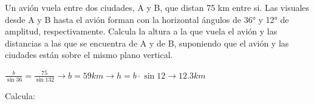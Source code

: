 \documentclass[addpoints,spanish, 12pt,a4paper]{exam}
\begin{document}
\begin{questions}
        
        \question[2] Un avión vuela entre dos ciudades, A y B, que distan 75 km entre si. Las visuales desde A y B hasta el avión forman con la horizontal ángulos de 36° y 12° de amplitud, respectivamente. Calcula la altura a la que vuela el avión y las distancias a las que se encuentra de A y de B, suponiendo que el avión y las ciudades están sobre el mismo plano vertical.
        \begin{solution}
        $\frac{b}{\sin 36}=\frac{75}{\sin 132}\to b = 59km \to h=b\cdot\sin 12 \to12.3km$
        \end{solution}
        
        
        \question Calcula:
        \begin{multicols}{1} 
        \end{multicols}
        

\end{questions}
\end{document}
